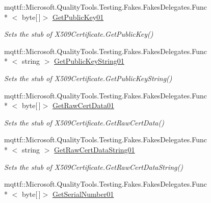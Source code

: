 \begin{DoxyCompactItemize}
mqttf\-::\-Microsoft.\-Quality\-Tools.\-Testing.\-Fakes.\-Fakes\-Delegates.\-Func\\*
$<$ byte\mbox{[}$\,$\mbox{]}$>$ \hyperlink{class_system_1_1_security_1_1_cryptography_1_1_x509_certificates_1_1_fakes_1_1_stub_x509_certificate2_ae65d34b11b41aec7125d4ef6f1343051}{Get\-Public\-Key01}
\begin{DoxyCompactList}\small\item\em Sets the stub of X509\-Certificate.\-Get\-Public\-Key()\end{DoxyCompactList}\item 
mqttf\-::\-Microsoft.\-Quality\-Tools.\-Testing.\-Fakes.\-Fakes\-Delegates.\-Func\\*
$<$ string $>$ \hyperlink{class_system_1_1_security_1_1_cryptography_1_1_x509_certificates_1_1_fakes_1_1_stub_x509_certificate2_a9415106f7f79dc7a630d31f1336f2e3f}{Get\-Public\-Key\-String01}
\begin{DoxyCompactList}\small\item\em Sets the stub of X509\-Certificate.\-Get\-Public\-Key\-String()\end{DoxyCompactList}\item 
mqttf\-::\-Microsoft.\-Quality\-Tools.\-Testing.\-Fakes.\-Fakes\-Delegates.\-Func\\*
$<$ byte\mbox{[}$\,$\mbox{]}$>$ \hyperlink{class_system_1_1_security_1_1_cryptography_1_1_x509_certificates_1_1_fakes_1_1_stub_x509_certificate2_ae651453d24d888047b3a6d5e89ea082f}{Get\-Raw\-Cert\-Data01}
\begin{DoxyCompactList}\small\item\em Sets the stub of X509\-Certificate.\-Get\-Raw\-Cert\-Data()\end{DoxyCompactList}\item 
mqttf\-::\-Microsoft.\-Quality\-Tools.\-Testing.\-Fakes.\-Fakes\-Delegates.\-Func\\*
$<$ string $>$ \hyperlink{class_system_1_1_security_1_1_cryptography_1_1_x509_certificates_1_1_fakes_1_1_stub_x509_certificate2_ae364ac2b81fb3c1a9e50373667e7a573}{Get\-Raw\-Cert\-Data\-String01}
\begin{DoxyCompactList}\small\item\em Sets the stub of X509\-Certificate.\-Get\-Raw\-Cert\-Data\-String()\end{DoxyCompactList}\item 
mqttf\-::\-Microsoft.\-Quality\-Tools.\-Testing.\-Fakes.\-Fakes\-Delegates.\-Func\\*
$<$ byte\mbox{[}$\,$\mbox{]}$>$ \hyperlink{class_system_1_1_security_1_1_cryptography_1_1_x509_certificates_1_1_fakes_1_1_stub_x509_certificate2_ab1e8ce21629fe549a4de0b3de43c84e0}{Get\-Serial\-Number01}

\end{DoxyCompactItemize}
